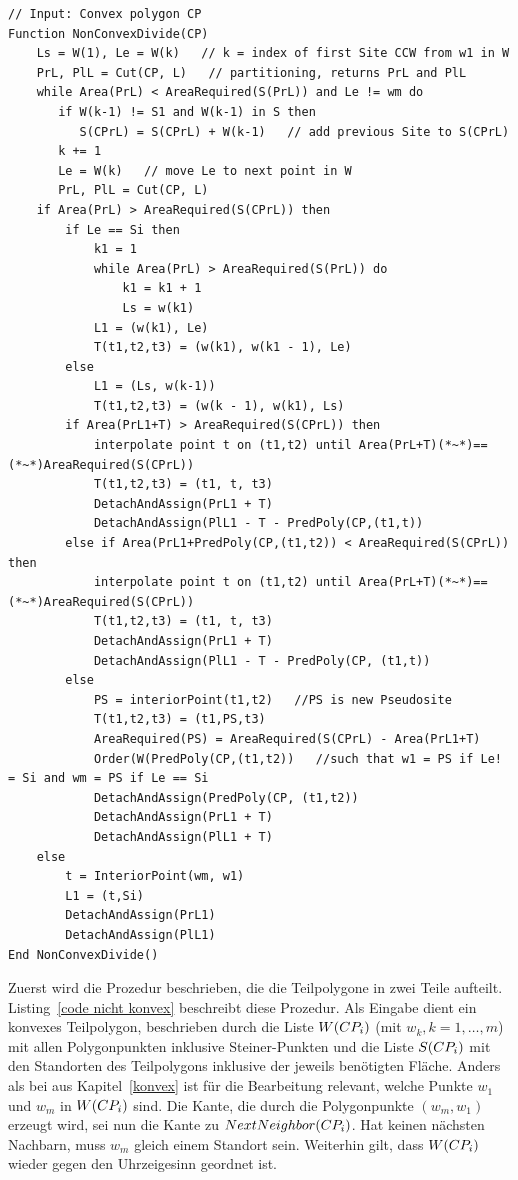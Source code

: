 \documentclass[ngerman]{seminarbeitrag}
\begin{document}
\begin{lstlisting}[float,caption={Der Algorithmus \noncon}, frame=single, label=code nicht konvex]
// Input: Convex polygon CP
Function NonConvexDivide(CP)
    Ls = W(1), Le = W(k)   // k = index of first Site CCW from w1 in W
    PrL, PlL = Cut(CP, L)   // partitioning, returns PrL and PlL
    while Area(PrL) < AreaRequired(S(PrL)) and Le != wm do
       if W(k-1) != S1 and W(k-1) in S then 
          S(CPrL) = S(CPrL) + W(k-1)   // add previous Site to S(CPrL)
       k += 1
       Le = W(k)   // move Le to next point in W
       PrL, PlL = Cut(CP, L)
    if Area(PrL) > AreaRequired(S(CPrL)) then
        if Le == Si then
            k1 = 1
            while Area(PrL) > AreaRequired(S(PrL)) do
                k1 = k1 + 1
                Ls = w(k1)
            L1 = (w(k1), Le)
            T(t1,t2,t3) = (w(k1), w(k1 - 1), Le)
        else
            L1 = (Ls, w(k-1))
            T(t1,t2,t3) = (w(k - 1), w(k1), Ls)
        if Area(PrL1+T) > AreaRequired(S(CPrL)) then
            interpolate point t on (t1,t2) until Area(PrL+T)(*~*)==(*~*)AreaRequired(S(CPrL))
            T(t1,t2,t3) = (t1, t, t3)
            DetachAndAssign(PrL1 + T)
            DetachAndAssign(PlL1 - T - PredPoly(CP,(t1,t))
        else if Area(PrL1+PredPoly(CP,(t1,t2)) < AreaRequired(S(CPrL)) then
            interpolate point t on (t1,t2) until Area(PrL+T)(*~*)==(*~*)AreaRequired(S(CPrL))
            T(t1,t2,t3) = (t1, t, t3)
            DetachAndAssign(PrL1 + T)
            DetachAndAssign(PlL1 - T - PredPoly(CP, (t1,t))
        else
            PS = interiorPoint(t1,t2)   //PS is new Pseudosite
            T(t1,t2,t3) = (t1,PS,t3)
            AreaRequired(PS) = AreaRequired(S(CPrL) - Area(PrL1+T)
            Order(W(PredPoly(CP,(t1,t2))   //such that w1 = PS if Le! = Si and wm = PS if Le == Si
            DetachAndAssign(PredPoly(CP, (t1,t2))
            DetachAndAssign(PrL1 + T)
            DetachAndAssign(PlL1 + T)
    else
        t = InteriorPoint(wm, w1)
        L1 = (t,Si)
        DetachAndAssign(PrL1)
        DetachAndAssign(PlL1)
End NonConvexDivide() 

\end{lstlisting}

Zuerst wird die Prozedur \noncon beschrieben, die die Teilpolygone in zwei Teile aufteilt. Listing~\ref{code nicht konvex} beschreibt diese Prozedur.
Als Eingabe dient ein konvexes Teilpolygon, beschrieben durch die Liste $W(CP_{i})$ (mit $w_{k}, k = 1,…,m$) mit allen Polygonpunkten inklusive Steiner-Punkten und die Liste $S(CP_{i})$ mit den Standorten des Teilpolygons inklusive der jeweils benötigten Fläche.
Anders als bei \con aus Kapitel~\ref{konvex} ist für die Bearbeitung relevant, welche Punkte $w_{1}$ und $w_{m}$ in $W(CP_{i})$ sind. Die Kante, die durch die Polygonpunkte $(w_{m}, w_{1})$ erzeugt wird, sei nun die Kante zu $NextNeighbor(CP_{i})$. Hat \cpi keinen nächsten Nachbarn, muss $w_{m}$ gleich einem Standort sein. Weiterhin gilt, dass $W(CP_{i})$ wieder gegen den Uhrzeigesinn geordnet ist.\\
\end{document}
